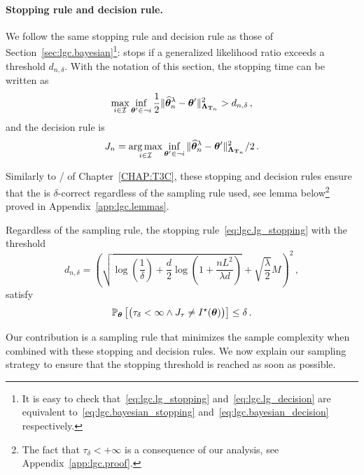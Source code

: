 \paragraph{Stopping rule and decision rule.}
We follow the same stopping rule and decision rule as those of Section~\ref{sec:lgc.bayesian}\footnote{It is easy to check that~\eqref{eq:lgc.lg_stopping} and~\eqref{eq:lgc.lg_decision} are equivalent to~\eqref{eq:lgc.bayesian_stopping} and~\eqref{eq:lgc.bayesian_decision} respectively.}: \LG{} stops if a generalized likelihood ratio exceeds a threshold $d_{n,\delta}$. With the notation of this section, the stopping time can be written as
\begin{align}\label{eq:lgc.lg_stopping}
    \max_{i\in \mathcal{I}} \inf_{{\boldsymbol \theta}' \in \neg i}\frac{1}{2}\Vert \widehat{{\boldsymbol \theta}}_n^\lambda - {\boldsymbol \theta}' \Vert^2_{{\boldsymbol \Lambda}_{{\bf T}_n}} > d_{n,\delta}\,,
\end{align}
and the decision rule is 
\begin{align}\label{eq:lgc.lg_decision}
    J_n = \operatorname*{arg\,max}_{i\in \mathcal{I}} \inf_{{\boldsymbol \theta}' \in \neg i}\Vert \widehat{{\boldsymbol \theta}}_n^\lambda - {\boldsymbol \theta}' \Vert^2_{{\boldsymbol \Lambda}_{{\bf T}_n}}/2\,.
\end{align}

Similarly to \TCC{}/\TTTS{} of Chapter~\ref{CHAP:T3C}, these stopping and decision rules ensure that the \LG{} is $\delta$-correct regardless of the sampling rule used, see lemma below\footnote{The fact that $\tau_\delta <+\infty$ is a consequence of our analysis, see Appendix~\ref{app:lgc.proof}.} proved in Appendix~\ref{app:lgc.lemmas}.

\begin{lemma}\label{lemma:lgc.pac}
\begin{leftbar}[lemmabar]
Regardless of the sampling rule, the stopping rule~\eqref{eq:lgc.lg_stopping} with the threshold
\begin{equation} \label{eq:def_beta}
    d_{n,\delta} =\left( \sqrt{\log\left( \frac{1}{\delta}\right)+\frac{d}{2}\log\left(1+\frac{n L^2}{\lambda d} \right)} +\sqrt{\frac{\lambda}{2}}M\right)^2\,,
\end{equation}
satisfy
\[
    \mathbb{P}_{\boldsymbol \theta}\left[\big(\tau_{\delta} < \infty \wedge J_\tau \neq I^\star({\boldsymbol \theta})\big)\right] \leq \delta\,.
\]
\end{leftbar}
\end{lemma}
Our contribution is a sampling rule that minimizes the sample complexity when combined with these stopping and decision rules.
We now explain our sampling strategy to ensure that the stopping threshold is reached as soon as possible.

